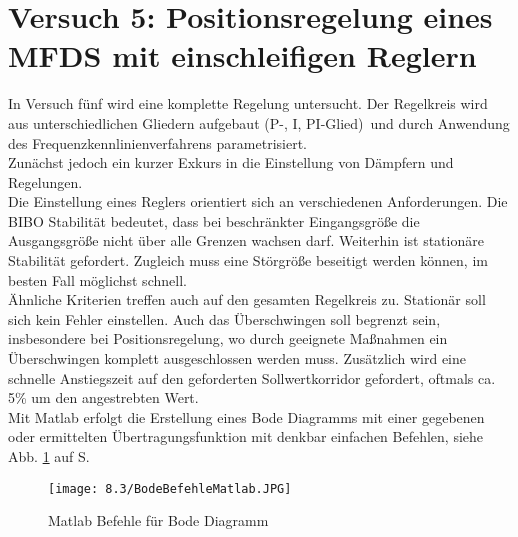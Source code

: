 \documentclass[12pt,a4paper]{scrartcl}	%
\begin{document}
\section{Versuch 5: Positionsregelung eines MFDS mit einschleifigen Reglern}
In Versuch fünf wird eine komplette Regelung untersucht. Der Regelkreis wird aus unterschiedlichen Gliedern aufgebaut (P-, I, PI-Glied)~und durch Anwendung des Frequenzkennlinienverfahrens parametrisiert.\\
Zunächst jedoch ein kurzer Exkurs in die Einstellung von Dämpfern und Regelungen.\\
Die Einstellung eines Reglers orientiert sich an verschiedenen Anforderungen. Die BIBO Stabilität bedeutet, dass bei beschränkter Eingangsgröße die Ausgangsgröße nicht über alle Grenzen wachsen darf. Weiterhin ist stationäre Stabilität gefordert. Zugleich muss eine Störgröße beseitigt werden können, im besten Fall möglichst schnell.\\
Ähnliche Kriterien treffen auch auf den gesamten Regelkreis zu. Stationär soll sich kein Fehler einstellen. Auch das Überschwingen soll begrenzt sein, insbesondere bei Positionsregelung, wo durch geeignete Maßnahmen ein Überschwingen komplett ausgeschlossen werden muss. Zusätzlich wird eine schnelle Anstiegszeit auf den geforderten Sollwertkorridor gefordert, oftmals ca. 5\% um den angestrebten Wert.\\
Mit Matlab erfolgt die Erstellung eines Bode Diagramms mit einer gegebenen oder ermittelten Übertragungsfunktion mit denkbar einfachen Befehlen, siehe Abb. \ref{bod} auf S. \pageref{bod.}
\begin{figure}[tbh]
	\centering
	\texttt{[image: 8.3/BodeBefehleMatlab.JPG]}
	\caption{Matlab Befehle für Bode Diagramm}
	\label{bod}
\end{figure}
\end{document}
